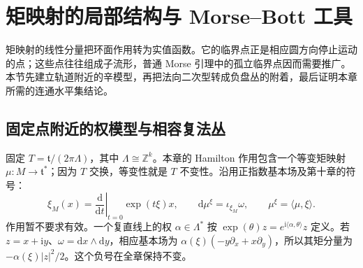 
% 
% 
% 
% 

\section{矩映射的局部结构与 Morse–Bott 工具}
\label{g4:sec:1201}

矩映射的线性分量把环面作用转为实值函数。它的临界点正是相应圆方向停止运动的点；这些点往往组成子流形，普通 Morse 引理中的孤立临界点因而需要推广。本节先建立轨道附近的辛模型，再把法向二次型转成负盘丛的附着，最后证明本章所需的连通水平集结论。

\subsection{固定点附近的权模型与相容复法丛}
\label{g4:subsec:1201:01}

固定 \(T=\mathfrak t/(2\pi\Lambda)\)，其中 \(\Lambda\cong\mathbb Z^k\)。本章的 Hamilton 作用包含一个等变矩映射 \(\mu:M\to\mathfrak t^*\)；因为 \(T\) 交换，等变性就是 \(T\) 不变性。沿用正指数基本场及第十章的符号：
\[
	\xi_M(x)=\left.\frac{\mathrm d}{\mathrm dt}\right|_{t=0}
	\exp(t\xi)x,\qquad
	\mathrm d\mu^\xi=\iota_{\xi_M}\omega,
	\qquad \mu^\xi=\langle\mu,\xi\rangle.
\]
作用暂不要求有效。一个复直线上的权 \(\alpha\in\Lambda^*\) 按 \(\exp(\theta)z=e^{\mathrm i\langle\alpha,\theta\rangle}z\) 定义。若 \(z=x+\mathrm iy\)、\(\omega=\mathrm dx\wedge\mathrm dy\)，相应基本场为 \(\alpha(\xi)(-y\partial_x+x\partial_y)\)，所以其矩分量为 \(-\alpha(\xi)|z|^2/2\)。这个负号在全章保持不变。

